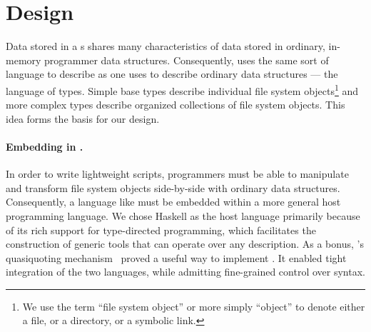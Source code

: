 \section{\forest{} Design}
\label{sec:language}

Data stored in a \filestore{}s shares many characteristics of
data stored in ordinary, in-memory programmer data structures.
Consequently, \forest{}
uses the same sort of language to describe \filestores{} as one uses to describe
ordinary data structures --- the language of types. 
Simple base
types describe individual file system objects\footnote{We use the term
``file system object'' or more simply ``object'' to denote either a
file, or a directory, or a symbolic link.} and more complex types 
describe organized collections of file system 
objects. 
This idea forms the basis for our design.

\paragraph*{Embedding \forest{} in \haskell{}.}
In order to write lightweight scripts, 
programmers must be able to manipulate and transform file system 
objects side-by-side with ordinary data structures.  Consequently,
a language like \forest{} must be embedded within a more general
host programming language.
We chose
Haskell as the host language primarily because of its rich support for 
type-directed programming, which facilitates the construction of generic 
tools that can operate over any \forest{}
description.  As a bonus, \haskell{}'s quasiquoting 
mechanism~\cite{Mainland:quasi} proved a
useful way to implement \forest{}.  It enabled tight integration of
the two languages, while admitting fine-grained control 
over \forest{} syntax.
  

